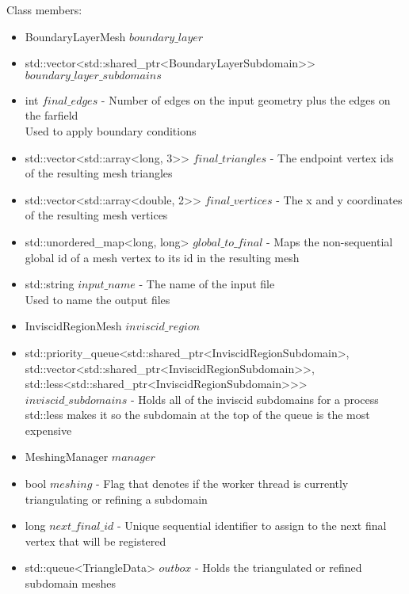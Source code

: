 \documentclass[manuscript, screen]{acmart}
\begin{document}
Class members:
\begin{itemize}
\item BoundaryLayerMesh $boundary\_layer$

\item std::vector<std::shared\_ptr<BoundaryLayerSubdomain>> $boundary\_layer\_subdomains$

\item int $final\_edges$ - Number of edges on the input geometry plus the edges on the farfield\\
Used to apply boundary conditions

\item std::vector<std::array<long, 3>> $final\_triangles$ - The endpoint vertex ids of the resulting mesh triangles

\item std::vector<std::array<double, 2>> $final\_vertices$ - The x and y coordinates of the resulting mesh vertices

\item std::unordered\_map<long, long> $global\_to\_final$ - Maps the non-sequential global id of a mesh vertex to its id in the resulting mesh

\item std::string $input\_name$ - The name of the input file\\
Used to name the output files

\item InviscidRegionMesh $inviscid\_region$

\item std::priority\_queue<std::shared\_ptr<InviscidRegionSubdomain>, std::vector<std::shared\_ptr<InviscidRegionSubdomain>>, std::less<std::shared\_ptr<InviscidRegionSubdomain>>> $inviscid\_subdomains$ - Holds all of the inviscid subdomains for a process\\
std::less makes it so the subdomain at the top of the queue is the most expensive

\item MeshingManager $manager$

\item bool $meshing$ - Flag that denotes if the worker thread is currently triangulating or refining a subdomain

\item long $next\_final\_id$ - Unique sequential identifier to assign to the next final vertex that will be registered

\item std::queue<TriangleData> $outbox$ - Holds the triangulated or refined subdomain meshes


\end{itemize}
\end{document}
